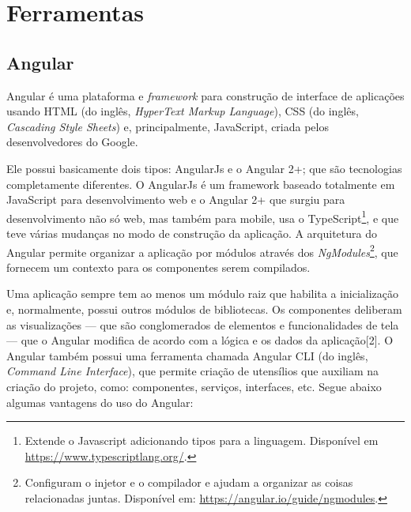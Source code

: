 \section{Ferramentas}
\label{sec:ferramentas}

\subsection{Angular}
\label{ssec:Angular}
Angular\cite{afonso2018angular} é uma plataforma e \textit{framework} para construção de interface de aplicações usando HTML (do inglês, \textit{HyperText Markup Language}), CSS (do inglês, \textit{Cascading Style Sheets}) e, principalmente, JavaScript, criada pelos desenvolvedores do Google. 

Ele possui basicamente dois tipos: AngularJs e o Angular 2+; que são tecnologias completamente diferentes. O AngularJs é um framework baseado totalmente em JavaScript para desenvolvimento web e o Angular 2+ que surgiu para desenvolvimento não só web, mas também para mobile, usa o TypeScript\footnote{Extende o Javascript adicionando tipos para a linguagem. Disponível em \url{https://www.typescriptlang.org/}.}, e que teve várias mudanças no modo de construção da aplicação. A arquitetura do Angular permite organizar a aplicação por módulos através dos \textit{NgModules}\footnote{Configuram o injetor e o compilador e ajudam a organizar as coisas relacionadas juntas. Disponível em: \url{https://angular.io/guide/ngmodules}.}, que fornecem um contexto para os componentes serem compilados. 

Uma aplicação sempre tem ao menos um módulo raiz que habilita a inicialização e, normalmente, possui outros módulos de bibliotecas. Os componentes deliberam as visualizações — que são conglomerados de elementos e funcionalidades de tela — que o Angular modifica de acordo com a lógica e os dados da aplicação[2]. O Angular também possui uma ferramenta chamada Angular CLI (do inglês, \textit{Command Line Interface}), que permite criação de utensílios que auxiliam na criação do projeto, como: componentes, serviços, interfaces, etc. Segue abaixo algumas vantagens do uso do Angular:  

